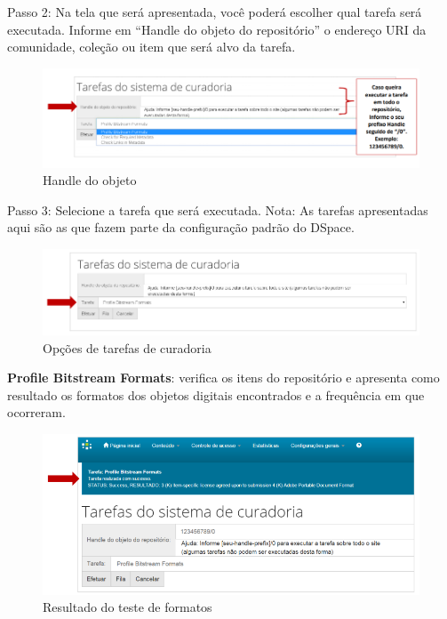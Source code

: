 \documentclass[12pt,hidelinks]{article}
\begin{document}
\newpage
    
    Passo 2: Na tela que será apresentada, você poderá escolher qual tarefa será executada. Informe em “Handle do objeto do repositório” o endereço URI da comunidade, coleção ou item que será alvo da tarefa.
    
    \begin{figure}[!htp]
                \centering
                \includegraphics[scale=0.7]{figura/Figura120.png}
                \caption{Handle do objeto}
            \label{Rotulo}
        \end{figure}
    
    Passo 3: Selecione a tarefa que será executada. Nota: As tarefas apresentadas aqui são as que fazem parte da configuração padrão do DSpace.
    
    \begin{figure}[!htp]
                \centering
                \includegraphics[scale=0.7]{figura/Figura121.png}
                \caption{Opções de tarefas de curadoria}
            \label{Rotulo}
        \end{figure}
    
    \textbf{Profile Bitstream Formats}: verifica os itens do repositório e apresenta como resultado os formatos dos objetos digitais encontrados e a frequência em que ocorreram.
    
    \begin{figure}[!htp]
                \centering
                \includegraphics[scale=0.7]{figura/Figura122.png}
                \caption{Resultado do teste de formatos}
            \label{Rotulo}
        \end{figure}
    
\end{document}
